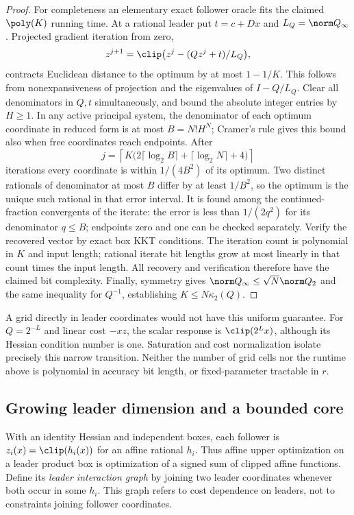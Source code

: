 \begin{proof}
For completeness an elementary exact follower oracle fits the claimed
\(\poly(K)\) running time. At a rational leader put \(t=c+Dx\) and
\(L_Q=\norm Q_\infty\). Projected gradient iteration from zero,
\[
 z^{j+1}=\clip\bigl(z^j-(Qz^j+t)/L_Q\bigr),
\]
contracts Euclidean distance to the optimum by at most \(1-1/K\). This follows
from nonexpansiveness of projection and the eigenvalues of \(I-Q/L_Q\).
Clear all denominators in \(Q,t\) simultaneously, and bound the absolute
integer entries by \(H\ge1\). In any active principal system, the denominator
of each optimum coordinate in reduced form is at most \(B=N!H^N\);
Cramer's rule gives this bound also when free coordinates reach endpoints.
After
\[
 j=\left\lceil K\bigl(2\lceil\log_2B\rceil+
               \lceil\log_2N\rceil+4\bigr)\right\rceil
\]
iterations every coordinate is within \(1/(4B^2)\) of its optimum. Two distinct
rationals of denominator at most \(B\) differ by at least \(1/B^2\), so the
optimum is the unique such rational in that error interval. It is found among
the continued-fraction convergents of the iterate: the error is less than
\(1/(2q^2)\) for its denominator \(q\le B\); endpoints zero and one can be
checked separately. Verify the recovered vector by exact box KKT conditions.
The iteration count is polynomial in \(K\) and input length; rational iterate
bit lengths grow at most linearly in that count times the input length.
All recovery and verification therefore have the claimed bit complexity.
Finally, symmetry gives \(\norm Q_\infty\le\sqrt N\norm Q_2\) and the same
inequality for \(Q^{-1}\), establishing \(K\le N\kappa_2(Q)\).
\end{proof}
A grid directly in leader coordinates would not have this uniform guarantee.
For \(Q=2^{-L}\) and linear cost \(-xz\), the scalar response is
\(\clip(2^Lx)\), although its Hessian condition number is one. Saturation and
cost normalization isolate precisely this narrow transition. Neither the
number of grid cells nor the runtime above is polynomial in accuracy bit
length, or fixed-parameter tractable in \(r\).

\subsection{Growing leader dimension and a bounded core}
\label{subsec:leader-structure}
With an identity Hessian and independent boxes, each follower is
\(z_i(x)=\clip(h_i(x))\) for an affine rational \(h_i\). Thus affine upper
optimization on a leader product box is optimization of a signed sum of
clipped affine functions. Define its \emph{leader interaction graph} by joining
two leader coordinates whenever both occur in some \(h_i\). This graph refers
to cost dependence on leaders, not to constraints joining follower coordinates.

